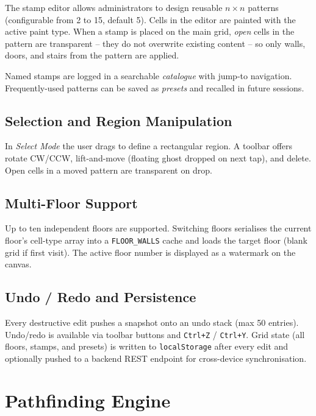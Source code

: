 \documentclass[12pt,a4paper]{article}
\begin{document}
The stamp editor allows administrators to design reusable $n{\times}n$ patterns
(configurable from 2 to 15, default 5). Cells in the editor are painted with
the active paint type. When a stamp is placed on the main grid, \emph{open}
cells in the pattern are transparent -- they do not overwrite existing
content -- so only walls, doors, and stairs from the pattern are applied.

Named stamps are logged in a searchable \emph{catalogue} with jump-to
navigation. Frequently-used patterns can be saved as \emph{presets} and
recalled in future sessions.

\subsection{Selection and Region Manipulation}

In \emph{Select Mode} the user drags to define a rectangular region. A toolbar
offers rotate CW/CCW, lift-and-move (floating ghost dropped on next tap), and
delete. Open cells in a moved pattern are transparent on drop.

\subsection{Multi-Floor Support}

Up to ten independent floors are supported. Switching floors serialises the
current floor's cell-type array into a \texttt{FLOOR\_WALLS} cache and loads
the target floor (blank grid if first visit). The active floor number is
displayed as a watermark on the canvas.

\subsection{Undo / Redo and Persistence}

Every destructive edit pushes a snapshot onto an undo stack (max 50 entries).
Undo/redo is available via toolbar buttons and \texttt{Ctrl+Z} / \texttt{Ctrl+Y}.
Grid state (all floors, stamps, and presets) is written to \texttt{localStorage}
after every edit and optionally pushed to a backend REST endpoint for
cross-device synchronisation.

\section{Pathfinding Engine}
\label{sec:path}
\end{document}
